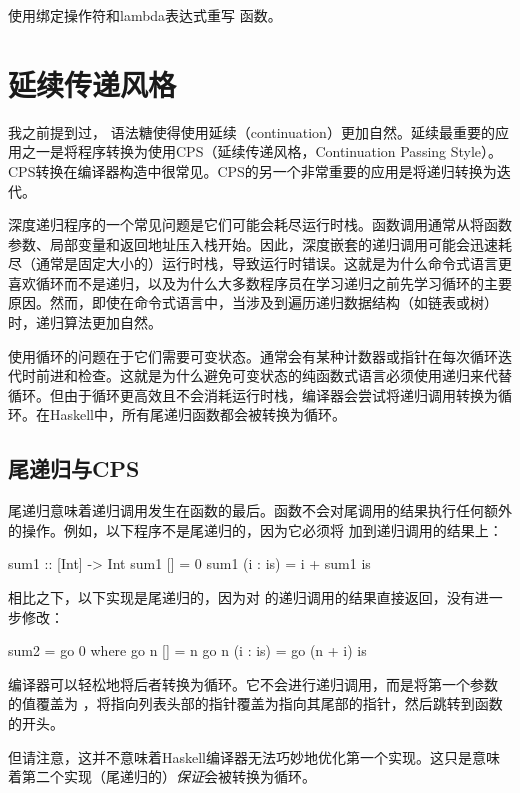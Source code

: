 \documentclass[DaoFP]{subfiles}
\begin{document}
\begin{exercise}
使用绑定操作符和lambda表达式重写  函数。
\end{exercise}

\section{延续传递风格}

我之前提到过， 语法糖使得使用延续（continuation）更加自然。延续最重要的应用之一是将程序转换为使用CPS（延续传递风格，Continuation Passing Style）。CPS转换在编译器构造中很常见。CPS的另一个非常重要的应用是将递归转换为迭代。

深度递归程序的一个常见问题是它们可能会耗尽运行时栈。函数调用通常从将函数参数、局部变量和返回地址压入栈开始。因此，深度嵌套的递归调用可能会迅速耗尽（通常是固定大小的）运行时栈，导致运行时错误。这就是为什么命令式语言更喜欢循环而不是递归，以及为什么大多数程序员在学习递归之前先学习循环的主要原因。然而，即使在命令式语言中，当涉及到遍历递归数据结构（如链表或树）时，递归算法更加自然。

使用循环的问题在于它们需要可变状态。通常会有某种计数器或指针在每次循环迭代时前进和检查。这就是为什么避免可变状态的纯函数式语言必须使用递归来代替循环。但由于循环更高效且不会消耗运行时栈，编译器会尝试将递归调用转换为循环。在Haskell中，所有尾递归函数都会被转换为循环。

\subsection{尾递归与CPS}

尾递归意味着递归调用发生在函数的最后。函数不会对尾调用的结果执行任何额外的操作。例如，以下程序不是尾递归的，因为它必须将  加到递归调用的结果上：
\begin{haskell}
sum1 :: [Int] -> Int
sum1 [] = 0
sum1 (i : is) = i + sum1 is
\end{haskell}
相比之下，以下实现是尾递归的，因为对  的递归调用的结果直接返回，没有进一步修改：
\begin{haskell}
sum2 = go 0 
  where go n [] = n
        go n (i : is) = go (n + i) is
\end{haskell}
编译器可以轻松地将后者转换为循环。它不会进行递归调用，而是将第一个参数  的值覆盖为 ，将指向列表头部的指针覆盖为指向其尾部的指针，然后跳转到函数的开头。

但请注意，这并不意味着Haskell编译器无法巧妙地优化第一个实现。这只是意味着第二个实现（尾递归的）\emph{保证}会被转换为循环。
\end{document}
